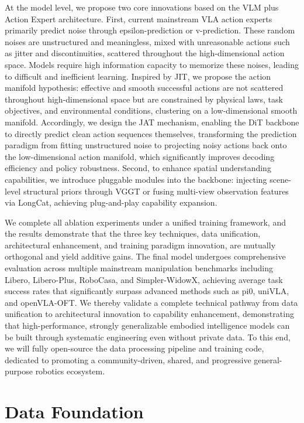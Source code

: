 \documentclass[11pt,a4paper]{article}
\begin{document}
At the model level, we propose two core innovations based on the VLM plus Action Expert architecture. First, current mainstream VLA action experts primarily predict noise through epsilon-prediction or v-prediction. These random noises are unstructured and meaningless, mixed with unreasonable actions such as jitter and discontinuities, scattered throughout the high-dimensional action space. Models require high information capacity to memorize these noises, leading to difficult and inefficient learning. Inspired by JIT, we propose the action manifold hypothesis: effective and smooth successful actions are not scattered throughout high-dimensional space but are constrained by physical laws, task objectives, and environmental conditions, clustering on a low-dimensional smooth manifold. Accordingly, we design the JAT mechanism, enabling the DiT backbone to directly predict clean action sequences themselves, transforming the prediction paradigm from fitting unstructured noise to projecting noisy actions back onto the low-dimensional action manifold, which significantly improves decoding efficiency and policy robustness. Second, to enhance spatial understanding capabilities, we introduce pluggable modules into the backbone: injecting scene-level structural priors through VGGT or fusing multi-view observation features via LongCat, achieving plug-and-play capability expansion.

We complete all ablation experiments under a unified training framework, and the results demonstrate that the three key techniques, data unification, architectural enhancement, and training paradigm innovation, are mutually orthogonal and yield additive gains. The final model undergoes comprehensive evaluation across multiple mainstream manipulation benchmarks including Libero, Libero-Plus, RoboCasa, and Simpler-WidowX, achieving average task success rates that significantly surpass advanced methods such as pi0, uniVLA, and openVLA-OFT. We thereby validate a complete technical pathway from data unification to architectural innovation to capability enhancement, demonstrating that high-performance, strongly generalizable embodied intelligence models can be built through systematic engineering even without private data. To this end, we will fully open-source the data processing pipeline and training code, dedicated to promoting a community-driven, shared, and progressive general-purpose robotics ecosystem.

\section{Data Foundation}
\end{document}
